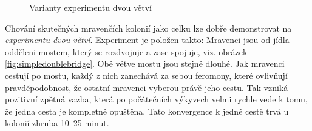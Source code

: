 \documentclass[12pt]{article}
\begin{document}
\begin{figure}[htbp]\caption{Varianty experimentu dvou větví} \label{fig:doublebridgevariants}
	\begin{center}
	\end{center}
\end{figure}

Chování skutečných mravenčích kolonií jako celku lze dobře demonstrovat na \emph{experimentu dvou větví}. Experiment je položen takto: Mravenci jsou od jídla odděleni mostem, který se rozdvojuje a zase spojuje, viz. obrázek \ref{fig:simpledoublebridge}. Obě větve mostu jsou stejně dlouhé. Jak mravenci cestují po mostu, každý z nich zanechává za sebou feromony, které ovlivňují pravděpodobnost, že ostatní mravenci vyberou právě jeho cestu. Tak vzniká pozitivní zpětná vazba, která po počátečních výkyvech velmi rychle vede k tomu, že jedna cesta je kompletně opuštěna. Tato konvergence k jedné cestě trvá u kolonií zhruba 10--25 minut. \cite{deneubourg1989}
\end{document}
